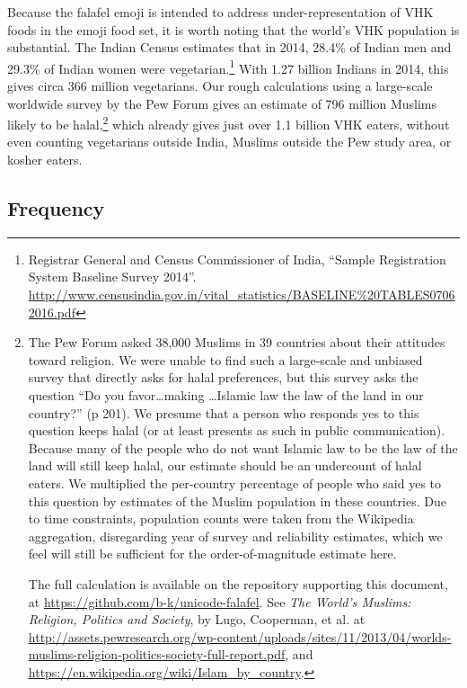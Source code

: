 \documentclass[a4paper,10pt]{article}
\begin{document}
Because the {\sc falafel} emoji is intended to address under-representation of VHK foods in the
emoji food set, it is worth noting that
the world's VHK population is substantial. The Indian Census estimates that
in 2014, 28.4\% of Indian men and 29.3\% of Indian women were
vegetarian.\footnote{Registrar General and Census Commissioner
of India, ``Sample Registration System Baseline Survey 2014''.
\url{http://www.censusindia.gov.in/vital_statistics/BASELINE\%20TABLES07062016.pdf}}
With 1.27 billion Indians in 2014, this gives circa 366 million vegetarians.
Our rough calculations using a large-scale worldwide survey by the Pew Forum gives an estimate
of 796 million Muslims likely to be halal,\footnote{The Pew Forum asked 38,000 Muslims in 39
countries about their attitudes toward religion. We were unable to find such a large-scale
and unbiased survey that directly asks for halal preferences, but 
this survey asks the question ``Do you
favor\dots making \dots Islamic law the law of the land in our country?'' (p 201). We presume that
a person who responds yes to this question keeps halal (or at least presents as such in public
communication). Because many of the people who do not want Islamic law to be the law of
the land will still keep halal, our estimate should be an undercount of halal eaters.
We multiplied the per-country percentage of people who said yes to this question by estimates of the Muslim population in these
countries. Due to time constraints, population counts were taken from the Wikipedia
aggregation, disregarding year of survey and reliability estimates,
which we feel will still be sufficient for the order-of-magnitude estimate here.

The full calculation is available on the repository supporting this document, at
\url{https://github.com/b-k/unicode-falafel}.  See 
{\em The World’s Muslims: Religion, Politics and Society}, by Lugo, Cooperman, et al.
at
\url{http://assets.pewresearch.org/wp-content/uploads/sites/11/2013/04/worlds-muslims-religion-politics-society-full-report.pdf},
and \url{https://en.wikipedia.org/wiki/Islam_by_country}.
}
which already gives just over 1.1 billion VHK eaters,
without even counting vegetarians outside India, Muslims outside the Pew study area, or
kosher eaters.


\subsection{Frequency}\label{freqsec}
\end{document}

